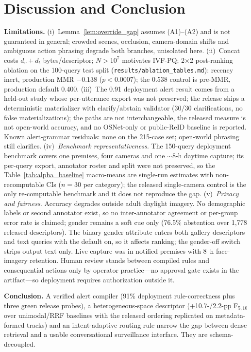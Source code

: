 ﻿\documentclass[conference]{IEEEtran}
\theoremstyle{plain}
\begin{document}
\section{Discussion and Conclusion}

\textbf{Limitations.} (i)~Lemma~\ref{lem:override_gap} assumes (A1)--(A2) and is not guaranteed in general; crowded scenes, occlusion, camera-domain shifts and ambiguous action phrasing degrade both branches, unisolated here. (ii)~Concat costs $d_v+d_t$ bytes/descriptor; $N>10^7$ motivates IVF-PQ; 2$\times$2 post-ranking ablation on the 100-query test split (\texttt{results/\allowbreak ablation\_\allowbreak tables.md}): recency inert, production MMR $-0.138$ ($p{<}0.0007$); the 0.538 control is pre-MMR, production default 0.400. (iii)~The 0.91 deployment alert result comes from a held-out study whose per-utterance export was not preserved; the release ships a deterministic materializer with clarify/abstain validator (30/30 clarifications, no false materializations); the paths are not interchangeable, the released measure is not open-world accuracy, and no OSNet-only or public-ReID baseline is reported. Known alert-grammar residuals: none on the 215-case set; open-world phrasing still clarifies. (iv)~\emph{Benchmark representativeness.} The 150-query deployment benchmark covers one premises, four cameras and one $\sim$8-h daytime capture; its per-query export, annotator roster and split were not preserved, so the Table~\ref{tab:alpha_baseline} macro-means are single-run estimates with non-recomputable CIs ($n{=}30$ per category); the released single-camera control is the only re-computable benchmark and it does not reproduce the gap. (v)~\emph{Privacy and fairness.} Accuracy degrades outside adult daylight imagery. No demographic labels or second annotator exist, so no inter-annotator agreement or per-group error rate is claimed; gender remains a soft cue only (76.5\% abstention over 1{,}778 released descriptors). The binary gender attribute enters both gallery descriptors and text queries with the default on, so it affects ranking; the gender-off switch strips output text only. Live capture was in notified premises with 8~h face-imagery retention. Human review stands between compiled rules and consequential actions only by operator practice---no approval gate exists in the artifact---so deployment requires authorization outside it.

\textbf{Conclusion.} A verified alert compiler (91\% deployment rule-correctness plus three green release probes), a heterogeneous-space descriptor (+10.7-/2.2-pp F$_{5,10}$ over unimodal/RRF baselines with the released ordering replicated on metadata-formed tracks) and an intent-adaptive routing rule narrow the gap between dense retrieval and a usable conversational surveillance interface. They are schema-decoupled.



\end{document}
